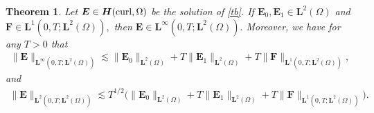 \documentclass[11pt,reqno]{amsart}
\newtheorem{theo}{Theorem}[section]
\numberwithin{equation}{section}
\begin{document}
\begin{theo}\label{pe}
 Let $\boldsymbol E \in \boldsymbol H ({\rm curl}, \Omega)$ be the solution of
\eqref{tb}. If $\boldsymbol E_0, \boldsymbol E_1 \in \boldsymbol L^2 (\Omega)$
 and $\boldsymbol F \in \boldsymbol L^1 (0, T; \boldsymbol L^2 (\Omega)),$ 
 then $\boldsymbol E \in  \boldsymbol L^{\infty} (0, T; \boldsymbol L^2
(\Omega)).$
 Moreover, we have for any $T>0$ that 
 \begin{align}\label{IE}
\|\boldsymbol E\|_{\boldsymbol L^{\infty} (0, T; \boldsymbol L^2 (\Omega))}
\lesssim \|\boldsymbol E_0\|_{\boldsymbol L^2 (\Omega)} + T \| \boldsymbol
E_1\|_{\boldsymbol L^2 (\Omega)} + T \|\boldsymbol F\|_{\boldsymbol L^1 (0, T;
\boldsymbol L^2 (\Omega))},
 \end{align}
 and
 \begin{align}\label{IE2}
 \|\boldsymbol E\|_{\boldsymbol L^{2}(0, T; \boldsymbol L^2 (\Omega))} \lesssim
T^{1/2} \big(\|\boldsymbol E_0\|_{\boldsymbol L^2 (\Omega)} +
T \| \boldsymbol E_1\|_{\boldsymbol L^2 (\Omega)} + T \|\boldsymbol
F\|_{\boldsymbol L^1 (0, T; \boldsymbol L^2 (\Omega))} \big).
 \end{align}
 \end{theo}
\end{document}
